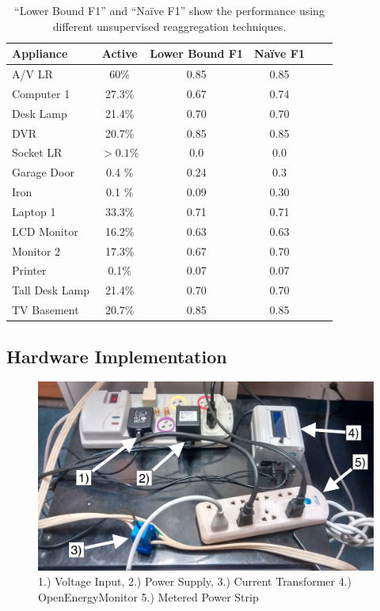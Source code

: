 \begin{table}[]
\setlength{\tabcolsep}{3pt}
\centering
\begin{tabular}{lccccc}
\hline
Appliance      & Active            & Lower Bound F1 & Na\"ive F1 \\ \hline
A/V LR         & 60\%              & 0.85        & 0.85         \\
Computer 1     & 27.3\%            & 0.67        & 0.74      \\
Desk Lamp      & 21.4\%            & 0.70        & 0.70     \\
DVR            & 20.7\%            & 0.85         & 0.85      \\
Socket LR      & $>0.1\%$ & 0.0       & 0.0      \\
Garage Door    & 0.4 \%            & 0.24          & 0.3  \\
Iron           & 0.1 \%            & 0.09        & 0.30   \\
Laptop 1       & 33.3\%            & 0.71        & 0.71   \\
LCD Monitor    & 16.2\%            & 0.63        & 0.63  \\
Monitor 2      & 17.3\%            & 0.67        & 0.70  \\
Printer        & 0.1\%             & 0.07           & 0.07 \\
Tall Desk Lamp & 21.4\%            & 0.70        & 0.70   \\
TV Basement    & 20.7\%            & 0.85        & 0.85   \\ \hline
\end{tabular}
\caption[BOLT: Unsupervised performance comparison]{ ``Lower Bound F1'' and ``Na\"ive F1'' show the performance using different unsupervised reaggregation techniques.}
\label{results_unsup}
\end{table}

\newpage
\subsection{Hardware Implementation}

\begin{figure}[!ht]
\includegraphics[width=0.85\linewidth]{bolt/OEM.jpg}
\caption[BOLT: The OpenEnergyMonitor setup.]{1.) Voltage Input, 2.) Power Supply, 3.) Current Transformer 4.) OpenEnergyMonitor 5.) Metered Power Strip }
\label{fg:oem}
\end{figure}

